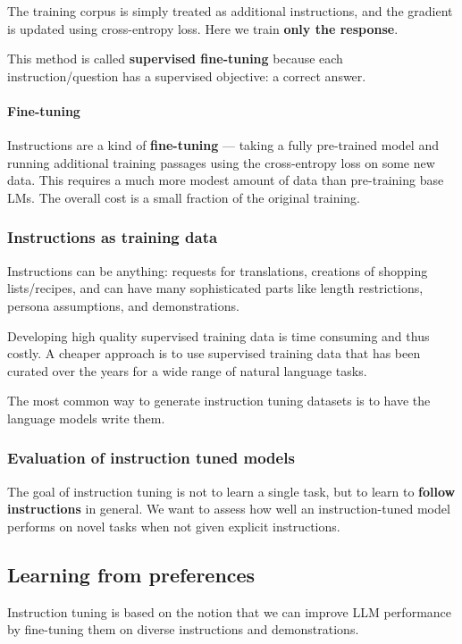 \documentclass[11pt]{article}
\begin{document}
The training corpus is simply treated as additional instructions, and the gradient is updated using cross-entropy loss. Here we train \textbf{only the response}.

This method is called \textbf{supervised fine-tuning} because each instruction/question has a supervised objective: a correct answer.

\paragraph{Fine-tuning} Instructions are a kind of \textbf{fine-tuning} --- taking a fully pre-trained model and running additional training passages using the cross-entropy loss on some new data. This requires a much more modest amount of data than pre-training base LMs. The overall cost is a small fraction of the original training.

\subsubsection{Instructions as training data}

Instructions can be anything: requests for translations, creations of shopping lists/recipes, and can have many sophisticated parts like length restrictions, persona assumptions, and demonstrations.

Developing high quality supervised training data is time consuming and thus costly. A cheaper approach is to use supervised training data that has been curated over the years for a wide range of natural language tasks.

The most common way to generate instruction tuning datasets is to have the language models write them.

\subsubsection{Evaluation of instruction tuned models}

The goal of instruction tuning is not to learn a single task, but to learn to \textbf{follow instructions} in general. We want to assess how well an instruction-tuned model performs on novel tasks when not given explicit instructions.


\subsection{Learning from preferences}

Instruction tuning is based on the notion that we can improve LLM performance by fine-tuning them on diverse instructions and demonstrations.

\end{document}
